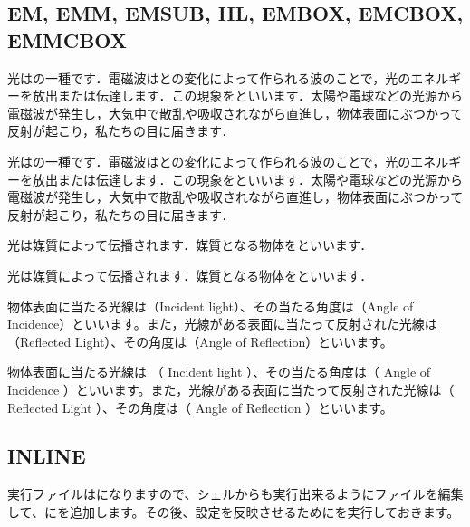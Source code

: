 \documentclass[../main]{subfiles}
\begin{document}
\subsection{EM, EMM, EMSUB, HL, EMBOX, EMCBOX, EMMCBOX}

光はの一種です．電磁波はとの変化によって作られる波のことで，光のエネルギーを放出または伝達します．この現象をといいます．太陽や電球などの光源から電磁波が発生し，大気中で散乱や吸収されながら直進し，物体表面にぶつかって反射が起こり，私たちの目に届きます．

\begin{code}[language=tex]
光はの一種です．電磁波はとの変化によって作られる波のことで，光のエネルギーを放出または伝達します．この現象をといいます．太陽や電球などの光源から電磁波が発生し，大気中で散乱や吸収されながら直進し，物体表面にぶつかって反射が起こり，私たちの目に届きます．
\end{code}

\leaderfill

光は媒質によって伝播されます．媒質となる物体をといいます．

\begin{code}[language=tex]
光は媒質によって伝播されます．媒質となる物体をといいます．
\end{code}

\leaderfill

物体表面に当たる光線は（Incident light）、その当たる角度は（Angle of Incidence）といいます。また，光線がある表面に当たって反射された光線は（Reflected Light）、その角度は（Angle of Reflection）といいます。

\begin{code}[language=tex]
物体表面に当たる光線は （ Incident light ）、その当たる角度は（ Angle of Incidence ）といいます。また，光線がある表面に当たって反射された光線は（ Reflected Light ）、その角度は（ Angle of Reflection ）といいます。
\end{code}

\leaderfill
\subsection{INLINE}

実行ファイルはになりますので、シェルからも実行出来るようにファイルを編集して、にを追加します。その後、設定を反映させるためにを実行しておきます。
\end{document}
